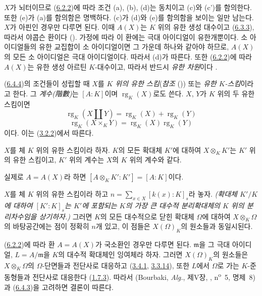 $X$가 뇌터이므로 (\hyperref[I.6.2.2-ko]{6.2.2})에 따라 조건 (a), (b),
(d)는 동치이고 (c)와 (c')를 함의한다. 또한 (e)가 (a)를 함의함은
명백하다. (c)가 (d)와 (e)를 함의함을 보이는 일만 남는다. $X$가 아핀인
경우만 다루면 된다. 이때 $A(X)$는 $K$ 위의 유한 생성 대수이고
(\hyperref[I.6.3.3-ko]{6.3.3}), 따라서 야콥슨 환이다
(\cite[p.~3-11 및 3-12]{I-1}). 가정에 따라 이 환에는 극대 아이디얼이
유한개뿐이다. 소 아이디얼들의 유한 교집합이 소 아이디얼이면 그 가운데
하나와 같아야 하므로, $A(X)$의 모든 소 아이디얼은 극대 아이디얼이다.
따라서 (d)가 따른다. 또한 (\hyperref[I.6.2.2-ko]{6.2.2})에 따라
$A(X)$는 유한 생성 아르틴 $K$-대수이고, 따라서 반드시
\emph{유한 차원}이다 \cite{I-21}.

\begin{env}[6.4.5]
\label{I.6.4.5-ko}
(\hyperref[I.6.4.4-ko]{6.4.4})의 조건들이 성립할 때 $X$를
\emph{$K$ 위의 유한 스킴}(\emph{참조}
()) 또는 \emph{유한 $K$-스킴}이라고 한다.
그 \emph{계수(階數)}는 $[A:K]$이며 $\operatorname{rg}_K(X)$로도 쓴다.
$X$, $Y$가 $K$ 위의 두 유한 스킴이면
\[
  \operatorname{rg}_K(X\amalg Y)
  =\operatorname{rg}_K(X)+\operatorname{rg}_K(Y)
  \tag{6.4.5.1}\label{I.6.4.5.1-ko}
\]
\[
  \operatorname{rg}_K(X\times_K Y)
  =\operatorname{rg}_K(X)\operatorname{rg}_K(Y)
  \tag{6.4.5.2}\label{I.6.4.5.2-ko}
\]
이다. 이는 (\hyperref[I.3.2.2-ko]{3.2.2})에서 따른다.
\end{env}

\begin{corollary}[6.4.6]
\label{I.6.4.6-ko}
$X$를 체 $K$ 위의 유한 스킴이라 하자. $K$의 모든 확대체 $K'$에 대하여
$X\otimes_K K'$는 $K'$ 위의 유한 스킴이고, $K'$ 위의 계수는 $X$의
$K$ 위의 계수와 같다.
\end{corollary}

실제로 $A=A(X)$라 하면 $[A\otimes_K K':K']=[A:K]$이다.

\begin{corollary}[6.4.7]
\label{I.6.4.7-ko}
$X$를 체 $K$ 위의 유한 스킴이라 하고
$n=\sum_{x\in X}[k(x):K]_s$라 놓자.
\emph{(확대체 $K'/K$에 대하여 $[K':K]_s$는 $K'$에 포함되는 $K$의
가장 큰 대수적 분리확대체의 $K$ 위의 \emph{분리차수}임을 상기하자.)}
그러면 $K$의 모든 대수적으로 닫힌 확대체 $\Omega$에 대하여
$X\otimes_K\Omega$의 바탕공간에는 점이 정확히 $n$개 있고, 이 점들은
$X(\Omega)_K$의 원소들과 동일시된다.
\end{corollary}

(\hyperref[I.6.2.2-ko]{6.2.2})에 따라 환 $A=A(X)$가 국소환인 경우만
다루면 된다. $\mathfrak m$을 그 극대 아이디얼, $L=A/\mathfrak m$을
$K$의 대수적 확대체인 잉여체라 하자. 그러면 $X(\Omega)_K$의 원소들은
$X\otimes_K\Omega$의 $\Omega$-단면들과 전단사로 대응하고
(\hyperref[I.3.4.1-ko]{3.4.1}, \hyperref[I.3.3.14-ko]{3.3.14}), 또한
$L$에서 $\Omega$로 가는 $K$-준동형들과 전단사로 대응한다
(\hyperref[I.1.7.3-ko]{1.7.3}). 따라서
(Bourbaki, \emph{Alg.}, 제V장, , n\textsuperscript{o}~5,
명제~8)과 (\hyperref[I.6.4.3-ko]{6.4.3})을 고려하면 결론이 따른다.

